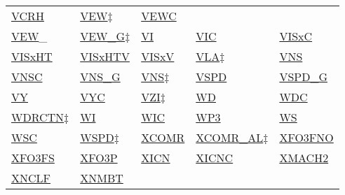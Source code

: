 \documentclass[
  english,
]{book}
\begin{document}
\begin{longtable}[]{@{}lllll@{}}
\href{./obsolete-variables.html\#cryo-hygro}{VCRH} &
\href{./obsolete-variables.html\#gsf-obsolete}{VEW\(\ddagger\)} &
\href{./the-state-of-the-aircraft.html\#vewc-vnsc}{VEWC} \\
\href{./the-state-of-the-aircraft.html\#vew}{VEW}\_ &
\href{./the-state-of-the-aircraft.html\#ggvew}{VEW\_G\(\ddagger\)} &
\href{./the-state-of-the-atmosphere.html\#ui-vi-wi}{VI} &
\href{./the-state-of-the-atmosphere.html\#uic-vic}{VIC} &
\href{./radiation-variables.html\#visxc}{VISxC} \\
\href{./radiation-variables.html\#visxht}{VISxHT} &
\href{./radiation-variables.html\#visxht}{VISxHTV} &
\href{./radiation-variables.html\#visxv}{VISxV} &
\href{./obsolete-variables.html\#vla}{VLA\(\ddagger\)} &
\href{./the-state-of-the-aircraft.html\#vns}{VNS} \\
\href{./the-state-of-the-aircraft.html\#vewc-vnsc}{VNSC} &
\href{./the-state-of-the-aircraft.html\#ggvns}{VNS\_G} &
\href{./obsolete-variables.html\#gsf-obsolete}{VNS\(\ddagger\)} &
\href{./the-state-of-the-aircraft.html\#vspd}{VSPD} &
\href{./the-state-of-the-aircraft.html\#ggvspd}{VSPD\_G} \\
\href{./the-state-of-the-atmosphere.html\#ux-vy}{VY} &
\href{./the-state-of-the-atmosphere.html\#uxc-vyc}{VYC} &
\href{./obsolete-variables.html\#vzi}{VZI\(\ddagger\)} &
\href{./the-state-of-the-atmosphere.html\#ws-wd}{WD} &
\href{./the-state-of-the-atmosphere.html\#wsc-wdc}{WDC} \\
\href{./obsolete-variables.html\#wspd}{WDRCTN\(\ddagger\)} &
\href{./the-state-of-the-atmosphere.html\#ui-vi-wi}{WI} &
\href{./the-state-of-the-atmosphere.html\#wic}{WIC} &
\href{./the-state-of-the-aircraft.html\#wp3}{WP3} &
\href{./the-state-of-the-atmosphere.html\#ws-wd}{WS} \\
\href{./the-state-of-the-atmosphere.html\#wsc-wdc}{WSC} &
\href{./obsolete-variables.html\#wspd}{WSPD\(\ddagger\)} &
\href{./air-chemistry-measurements.html\#comr-al}{XCOMR} &
\href{./air-chemistry-measurements.html\#comr-al}{XCOMR\_AL\(\ddagger\)}
& \href{./air-chemistry-measurements.html\#xf03fs}{XFO3FNO} \\
\href{./air-chemistry-measurements.html\#xf03fs}{XFO3FS} &
\href{./air-chemistry-measurements.html\#xf03p}{XFO3P} &
\href{./aerosol-particle-measurements.html\#xicnc}{XICN} &
\href{./aerosol-particle-measurements.html\#xicnc}{XICNC} &
\href{./the-state-of-the-atmosphere.html\#mach-number}{XMACH2} \\
\href{./air-chemistry-measurements.html\#no-noy}{XNCLF} &
\href{./air-chemistry-measurements.html\#no-noy}{XNMBT} &

\end{longtable}
\end{document}
